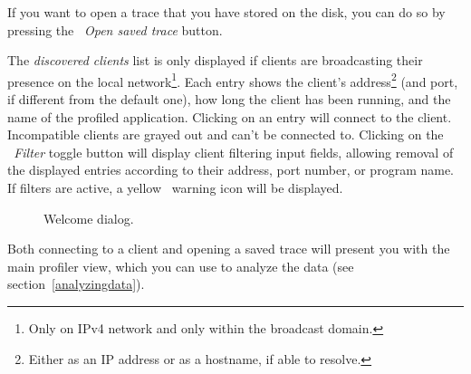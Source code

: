 \documentclass[hidelinks,titlepage,a4paper]{article}
\begin{document}
If you want to open a trace that you have stored on the disk, you can do so by pressing the \faFolderOpen{}~\emph{Open saved trace} button.

The \emph{discovered clients} list is only displayed if clients are broadcasting their presence on the local network\footnote{Only on IPv4 network and only within the broadcast domain.}. Each entry shows the client's address\footnote{Either as an IP address or as a hostname, if able to resolve.} (and port, if different from the default one), how long the client has been running, and the name of the profiled application. Clicking on an entry will connect to the client. Incompatible clients are grayed out and can't be connected to. Clicking on the \emph{\faFilter{}~Filter} toggle button will display client filtering input fields, allowing removal of the displayed entries according to their address, port number, or program name. If filters are active, a yellow \faExclamationTriangle{}~warning icon will be displayed.

\begin{figure}[h]
\centering{}
\caption{Welcome dialog.}
\label{welcomedialog}
\end{figure}

Both connecting to a client and opening a saved trace will present you with the main profiler view, which you can use to analyze the data (see section~\ref{analyzingdata}).
\end{document}

